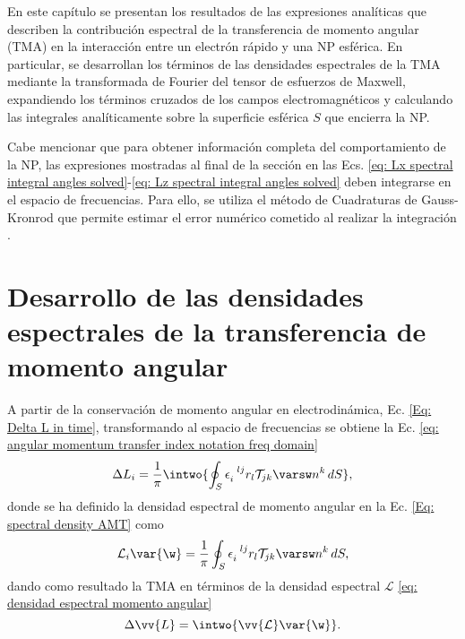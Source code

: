 \label{cap: resultados}

En este capítulo se presentan los resultados de las expresiones analíticas que describen la contribución espectral de la transferencia de momento angular (TMA) en la interacción entre un electrón rápido y una NP esférica. En particular, se desarrollan los términos de las densidades espectrales de la TMA mediante la transformada de Fourier del tensor de esfuerzos de Maxwell, expandiendo los términos cruzados de los campos electromagnéticos y calculando las integrales analíticamente sobre la superficie esférica $S$ que encierra la NP.

Cabe mencionar que para obtener información completa del comportamiento de la NP, las expresiones mostradas al final de la sección en las Ecs. \eqref{eq: Lx spectral integral angles solved}-\eqref{eq: Lz spectral integral angles solved} deben integrarse en el espacio de frecuencias. Para ello, se utiliza el método de Cuadraturas de Gauss-Kronrod que permite estimar el error numérico cometido al realizar la integración \cite{kahaner1989numerical}.

\section{Desarrollo de las densidades espectrales de la transferencia de momento angular}
A partir de la conservación de momento angular en electrodinámica, Ec. \eqref{Eq: Delta L in time}, transformando al espacio de frecuencias se obtiene la Ec. \eqref{eq: angular momentum transfer index notation freq domain}
\begin{equation}
\Delta L_i = \frac{1}{\pi} \intwo{\oint_S \epsilon_{i}^{\,\,\,\, lj} r_l \mathcal{T}_{jk}\varsw n^k\,dS}, \nonumber
\end{equation} 
donde se ha definido la densidad espectral de momento angular en la Ec. \eqref{Eq: spectral density AMT}  como
\begin{equation}
\mathcal{L}_i\var{\w} = \frac{1}{\pi} \oint_S \epsilon_{i}^{\,\,\,\, lj} r_l \mathcal{T}_{jk}\varsw n^k\,dS, \nonumber
\end{equation}
dando como resultado la TMA en términos de la densidad espectral $\mathcal{L}$ \eqref{eq: densidad espectral momento angular}
\begin{equation}
\Delta \vv{L} = \intwo{\vv{\mathcal{L}}\var{\w}}. \nonumber
\end{equation}

